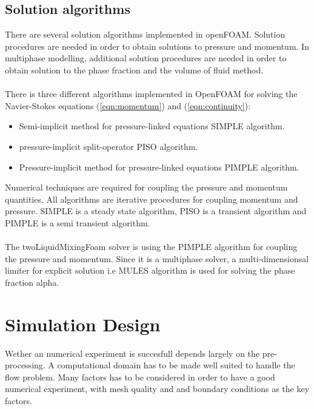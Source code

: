 \documentclass[a4paper, 12pt]{report}
\begin{document}
\section{Solution algorithms}
There are several solution algorithms implemented in openFOAM. Solution procedures are needed in order to obtain solutions to pressure and momentum. In multiphase modelling, additional solution procedures are needed in order to obtain solution to the phase fraction and the volume of fluid method.\\
\\
There is three different algorithms implemented in OpenFOAM for solving the Navier-Stokes equations (\ref{eqn:momentum}) and (\ref{eqn:continuity}):
\begin{itemize}
\item Semi-implicit method for pressure-linked equations SIMPLE algorithm.
\item pressure-implicit split-operator PISO algorithm.
\item Pressure-implicit method for pressure-linked equations PIMPLE algorithm.
\end{itemize}
Numerical techniques are required for coupling the pressure and momentum quantities.
All algorithms are iterative procedures for coupling momentum and pressure. SIMPLE is a steady state algorithm, PISO is a transient algorithm and PIMPLE is a semi transient algorithm.\\
\\
The twoLiquidMixingFoam solver is using the PIMPLE algorithm for coupling the pressure and momentum. Since it is a multiphase solver, a multi-dimensionsal limiter for explicit solution i.e MULES algorithm is used for solving the phase fraction alpha.
\chapter{Simulation Design}
Wether an numerical experiment is succesfull depends largely on the pre-processing. A computational domain has to be made well suited to handle the flow problem. Many factors has to be considered in order to have a good numerical experiment, with mesh quality and and boundary conditions as the key factors.
\end{document}
